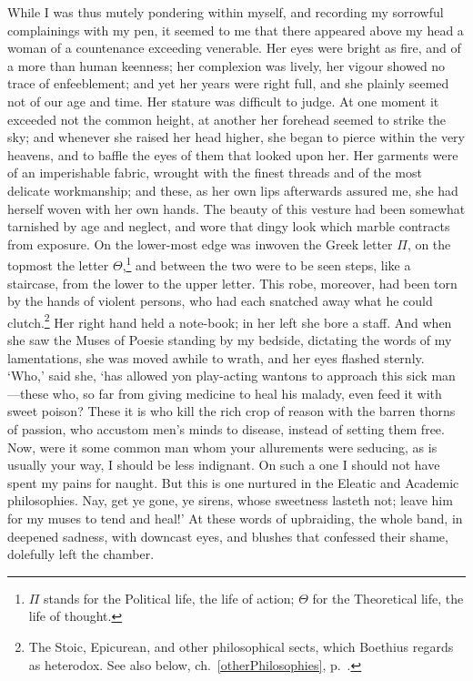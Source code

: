 \documentclass[11pt]{book}
\begin{document}
While I was thus mutely pondering within myself, and recording       
my sorrowful complainings with my pen, it seemed to me that there       
appeared above my head a \linebreak woman of a countenance exceeding venerable.    
Her eyes were bright as fire, and of a more than human keenness; her    
complexion was lively, her vigour showed no trace of enfeeblement; and  
yet her years were right full, and she plainly seemed not of our age    
and time. Her stature was difficult to judge. At one moment it exceeded 
not the common height, at another her forehead seemed to strike the     
sky; and whenever she raised her head higher, she began to pierce       
within the very heavens, and to baffle the eyes of them that looked     
upon her. Her garments were of an imperishable fabric, wrought with     
the finest threads and of the most delicate workmanship; and these,     
as her own lips afterwards assured me, she had herself woven with her   
own hands. The beauty of this vesture had been somewhat tarnished by    
age and neglect, and wore that dingy look which marble contracts from   
exposure. On the lower-most edge was inwoven the Greek letter $\Pi$,    
on the topmost the letter $\Theta$,\footnote{$\Pi$ stands for the       
Political life, the life of action; $\Theta$ for the Theoretical life,  
the life of thought.} and between the two were to be seen steps, like   
a staircase, from the lower to the upper letter. This robe, moreover,   
had been torn by the hands of violent persons, who had each snatched    
away what he could clutch.\footnote{The Stoic, Epicurean, and other     
philosophical sects, which Boethius regards as heterodox. See also      
below, ch.~\ref{otherPhilosophies}, p.~\pageref{otherPhilosophies}.}    
Her right hand held a note-book; in her left she bore a staff. And      
when she saw the Muses of Poesie standing by my bedside, dictating the  
words of my lamentations, she was moved awhile to wrath, and her eyes   
flashed sternly. `Who,' said she, `has allowed yon play-acting wantons  
to approach this sick man---these who, so far from giving medicine to    
heal his malady, even feed it with sweet poison? These it is who kill   
the rich crop of reason with the barren thorns of passion, who accustom 
men's minds to disease, instead of setting them free. Now, were it some 
common man whom your allurements were seducing, as is usually your way, 
I should be less indignant. On such a one I should not have spent my    
pains for naught. But this is one nurtured in the Eleatic and Academic  
philosophies. Nay, get ye gone, ye sirens, whose sweetness lasteth not; 
leave him for my muses to tend and heal!' At these words of upbraiding, 
the whole band, in deepened sadness, with downcast eyes, and blushes    
that confessed their shame, dolefully left the chamber.                 
\end{document}
